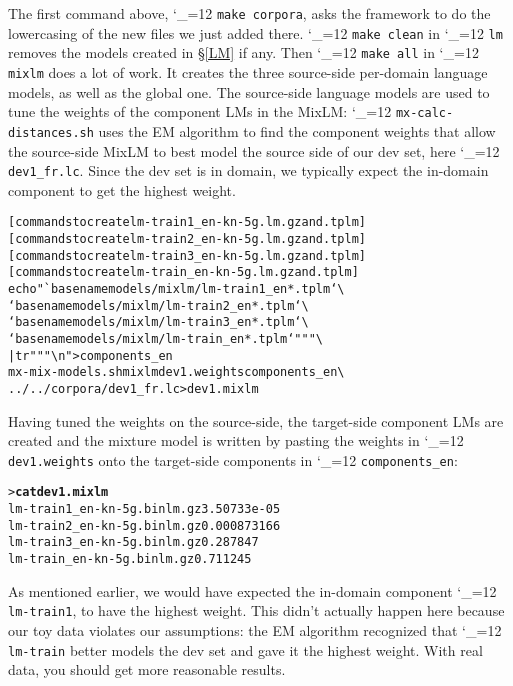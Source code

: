 \documentclass[11pt,letterpaper]{article}
\newcommand{\bs}{\textbackslash{}}
\def\code{\begingroup\catcode`\_=12 \codex}
\newcommand{\codex}[1]{\texttt{#1}\endgroup}
\begin{document}
The first command above, \code{make corpora}, asks the framework to do the
lowercasing of the new files we just added there.  \code{make clean} in
\code{lm} removes the models created in \S\ref{LM} if any. Then \code{make all}
in \code{mixlm} does a
lot of work.  It creates the three source-side per-domain language models, as
well as the global one.  The source-side language models are used to tune the
weights of the component LMs in the MixLM: \code{mx-calc-distances.sh} uses the
EM algorithm to find the component weights that allow the source-side MixLM to
best model the source side of our dev set, here \code{dev1_fr.lc}.  Since the
dev set is in domain, we typically expect the in-domain component to get the
highest weight.

\begin{small}
\begin{alltt}
   [commands to create lm-train1_en-kn-5g.lm.gz and .tplm]
   [commands to create lm-train2_en-kn-5g.lm.gz and .tplm]
   [commands to create lm-train3_en-kn-5g.lm.gz and .tplm]
   [commands to create lm-train_en-kn-5g.lm.gz and .tplm]
   echo "`basename models/mixlm/lm-train1_en*.tplm` \bs
         `basename models/mixlm/lm-train2_en*.tplm` \bs
         `basename models/mixlm/lm-train3_en*.tplm` \bs
         `basename models/mixlm/lm-train_en*.tplm`" "" \bs
      | tr " " "\bs{}n" > components_en
   mx-mix-models.sh mixlm dev1.weights components_en \bs
      ../../corpora/dev1_fr.lc > dev1.mixlm
\end{alltt}
\end{small}

Having tuned the weights on the source-side, the target-side component LMs are
created and the mixture model is written by pasting the weights in
\code{dev1.weights} onto the target-side components in \code{components_en}:
\begin{small}
\begin{alltt}
   > \textbf{cat dev1.mixlm}
   lm-train1_en-kn-5g.binlm.gz     3.50733e-05
   lm-train2_en-kn-5g.binlm.gz     0.000873166
   lm-train3_en-kn-5g.binlm.gz     0.287847
   lm-train_en-kn-5g.binlm.gz      0.711245
\end{alltt}
\end{small}

As mentioned earlier, we would have expected the in-domain component
\code{lm-train1}, to have
the highest weight.  This didn't actually happen here because our toy data
violates our assumptions: the EM algorithm recognized that \code{lm-train}
better models the dev set and gave it the highest weight.  With real data,
you should get more reasonable results.
\end{document}

